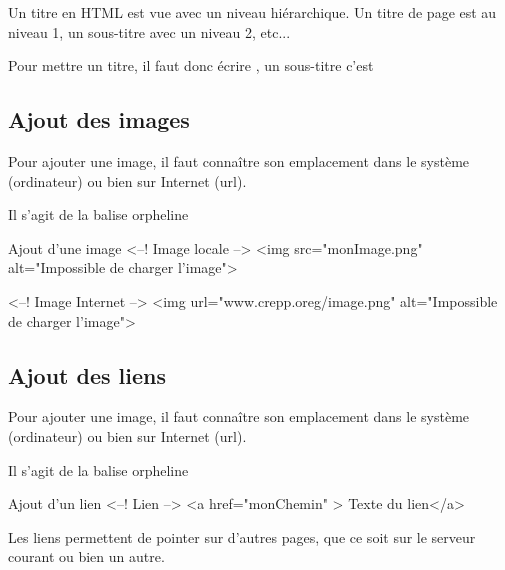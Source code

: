 Un titre en HTML est vue avec un niveau hiérarchique. 
Un titre de page est au niveau 1, un sous-titre avec un niveau 2, etc...

Pour mettre un titre, il faut donc écrire , un sous-titre 
c'est \\


\subsection{Ajout des images}

Pour ajouter une image, il faut connaître son emplacement dans le système (ordinateur) ou bien sur Internet (url).

Il s'agit de la balise orpheline 

\begin{Html}{Ajout d'une image}
<--! Image locale -->
<img src="monImage.png" alt="Impossible de charger l'image">

<--! Image Internet -->
<img url="www.crepp.oreg/image.png" alt="Impossible de charger l'image">
\end{Html}


\subsection{Ajout des liens}

Pour ajouter une image, il faut connaître son emplacement dans le système (ordinateur) ou bien sur Internet (url).

Il s'agit de la balise orpheline 

\begin{Html}{Ajout d'un lien}
<--! Lien -->
<a href="monChemin" > Texte du lien</a>
\end{Html}
Les liens permettent de pointer sur d'autres pages, que ce soit sur le serveur courant ou bien un autre.




